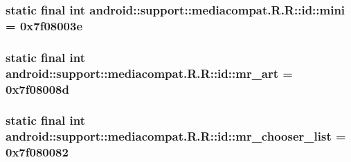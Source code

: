\hypertarget{classandroid_1_1support_1_1mediacompat_1_1_r_1_1id_bd023be09be8ad32a506526bb706db2f}{
\subsubsection[{mini}]{\setlength{\rightskip}{0pt plus 5cm}static final int android::support::mediacompat.R.R::id::mini = 0x7f08003e}}
\label{classandroid_1_1support_1_1mediacompat_1_1_r_1_1id_bd023be09be8ad32a506526bb706db2f}


\hypertarget{classandroid_1_1support_1_1mediacompat_1_1_r_1_1id_08cd5553686466d6b052f988e825af35}{
\subsubsection[{mr\_\-art}]{\setlength{\rightskip}{0pt plus 5cm}static final int android::support::mediacompat.R.R::id::mr\_\-art = 0x7f08008d}}
\label{classandroid_1_1support_1_1mediacompat_1_1_r_1_1id_08cd5553686466d6b052f988e825af35}


\hypertarget{classandroid_1_1support_1_1mediacompat_1_1_r_1_1id_331261df4cbcef48bd2b1ad8df6366ea}{
\subsubsection[{mr\_\-chooser\_\-list}]{\setlength{\rightskip}{0pt plus 5cm}static final int android::support::mediacompat.R.R::id::mr\_\-chooser\_\-list = 0x7f080082}}
\label{classandroid_1_1support_1_1mediacompat_1_1_r_1_1id_331261df4cbcef48bd2b1ad8df6366ea}


